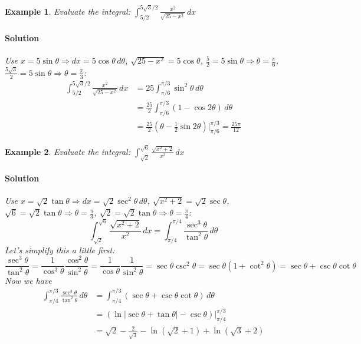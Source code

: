 \documentclass[letterpaper, 11pt, openany]{book}
\theoremstyle{mytheoremstyle}
\theoremstyle{myexamplestyle}
\newtheorem{example}{Example}[section]
\newenvironment{solution}{\paragraph{\sffamily \smaller \fontseries{b}\selectfont Solution}}{\hfill\faSquare}
\begin{document}
\begin{example}\label{e:trigsubdintsec}
    Evaluate the integral: $\displaystyle \int_{5/2}^{5\sqrt{3}/2} \frac{x^{2}}{\sqrt{25 - x^{2}}} \, dx$
    
    \begin{solution}
        Use $x = 5\sin \theta \Rightarrow dx = 5 \cos \theta \, d\theta$, $\sqrt{25-x^{2}} = 5 \cos \theta$, $\frac{5}{2} = 5\sin \theta \Rightarrow \theta = \frac{\pi}{6}$, $\frac{5\sqrt{3}}{2} = 5\sin \theta \Rightarrow \theta = \frac{\pi}{3}$:
        \begin{align*}
            \int_{5/2}^{5\sqrt{3}/2} \frac{x^{2}}{\sqrt{25 - x^{2}}} \, dx &= 25 \int_{\pi/6}^{\pi/3} \sin^{2} \theta \, d\theta \\
            &= \frac{25}{2} \int_{\pi/6}^{\pi/3} \left( 1 - \cos 2\theta \right)\, d\theta \\
            &= \frac{25}{2} \left( \theta - \frac{1}{2}\sin 2\theta \right)\bigg|_{\pi/6}^{\pi/3} = \frac{25\pi}{12}
        \end{align*}
    \end{solution}
\end{example}

\begin{example}\label{e:trigsubtandefint}
    Evaluate the integral: $\displaystyle \int_{\sqrt{2}}^{\sqrt{6}} \frac{\sqrt{x^{2}+2}}{x^{2}} \, dx$
    \begin{solution}
        Use $x = \sqrt{2}\tan \theta \Rightarrow dx = \sqrt{2} \sec^{2} \theta \, d\theta$, $\sqrt{x^{2}+ 2} = \sqrt{2} \sec \theta$, $\sqrt{6} = \sqrt{2} \tan  \theta \Rightarrow \theta = \frac{\pi}{3}$, $\sqrt{2} = \sqrt{2} \tan  \theta \Rightarrow \theta = \frac{\pi}{4}$:
        \[
            \int_{\sqrt{2}}^{\sqrt{6}} \frac{\sqrt{x^{2}+2}}{x^{2}} \, dx = \int_{\pi/4}^{\pi/4} \frac{\sec^{3}\theta}{\tan^{2}\theta}\, d\theta
        \]
    Let's simplify this a little first:
    \[\frac{\sec^{3}\theta}{\tan^{2}\theta} = \frac{1}{\cos^{3}\theta} \frac{\cos^{2}\theta}{\sin^{2}\theta} = \frac{1}{\cos \theta} \frac{1}{\sin^{2}\theta} = \sec \theta \csc^{2}\theta = \sec \theta (1 + \cot^{2} \theta) = \sec \theta + \csc \theta \cot \theta\]
    Now we have
        \begin{align*}
            \int_{\pi/4}^{\pi/3} \frac{\sec^{3}\theta}{\tan^{2}\theta}\, d\theta &= \int_{\pi/4}^{\pi/3} \left( \sec \theta + \csc \theta \cot \theta \right) \, d\theta \\
            &= \left(\ln \left| \sec \theta + \tan \theta \right| - \csc \theta \right) \bigg|_{\pi/4}^{\pi/3} \\
            &= \sqrt{2}-\frac{2}{\sqrt{3}}-\ln \left(\sqrt{2}+1\right) + \ln\left(\sqrt{3}+2\right)
        \end{align*}
    \end{solution}
\end{example}
\end{document}
